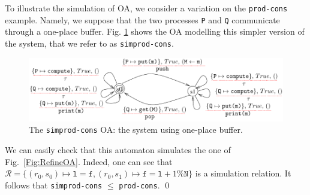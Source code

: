 \documentclass[runningheads]{llncs}
\newcommand{\xrightarrowdbl}[2][]{%
  \xrightarrow[#1]{#2}\mathrel{\mkern-14mu}\rightarrow
}
\begin{document}




\begin{example} \label{example:fifo-system-one}
To illustrate the simulation  of OA, we consider a variation on the \texttt{prod-cons} example. Namely,  we suppose that  the two processes  \texttt{P} and  \texttt{Q} communicate through a one-place  buffer. Fig. \ref{Fig:SpecOA} shows the OA modelling this simpler version of the system, that we refer to as \texttt{simprod-cons}. 
\begin{figure}[!b]
 \centering
   \includegraphics[width=.90\textwidth]{Figures/FIFOpen2.pdf}
   \caption{  The \texttt{simprod-cons} OA: the system using one-place  buffer.  \label{Fig:SpecOA}}
\end{figure}
We can easily check that this automaton simulates the one of Fig.~\ref{Fig:RefineOA}.
Indeed, one can see that  $\mathcal{R}=\{(r_0,s_0) \mapsto \texttt{l}=\texttt{f}, (r_0,s_1) \mapsto \texttt{f}=\texttt{l}+1\% \texttt{N} \}$ is  a  simulation 
relation. It follows that  \texttt{simprod-cons} $\leq$ \texttt{prod-cons}. \qed
\end{example}
\end{document}
